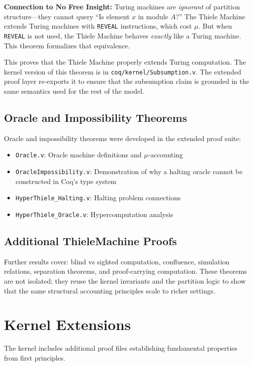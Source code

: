\textbf{Connection to No Free Insight:} Turing machines are \textit{ignorant} of partition structure---they cannot query ``Is element $x$ in module $A$?'' The Thiele Machine extends Turing machines with \texttt{REVEAL} instructions, which cost $\mu$. But when \texttt{REVEAL} is not used, the Thiele Machine behaves \textit{exactly} like a Turing machine. This theorem formalizes that equivalence.


This proves that the Thiele Machine properly extends Turing computation.
The kernel version of this theorem is in \texttt{coq/kernel/Subsumption.v}. The extended proof layer re-exports it to ensure that the subsumption claim is grounded in the same semantics used for the rest of the model.

\subsection{Oracle and Impossibility Theorems}

Oracle and impossibility theorems were developed in the extended proof suite:
\begin{itemize}
    \item \texttt{Oracle.v}: Oracle machine definitions and $\mu$-accounting
    \item \texttt{OracleImpossibility.v}: Demonstration of why a halting oracle cannot be constructed in Coq's type system
    \item \texttt{HyperThiele\_Halting.v}: Halting problem connections
    \item \texttt{HyperThiele\_Oracle.v}: Hypercomputation analysis
\end{itemize}

\subsection{Additional ThieleMachine Proofs}

Further results cover: blind vs sighted computation, confluence, simulation relations, separation theorems, and proof-carrying computation. These theorems are not isolated; they reuse the kernel invariants and the partition logic to show that the same structural accounting principles scale to richer settings.

\section{Kernel Extensions}

The kernel includes additional proof files establishing fundamental properties from first principles.

